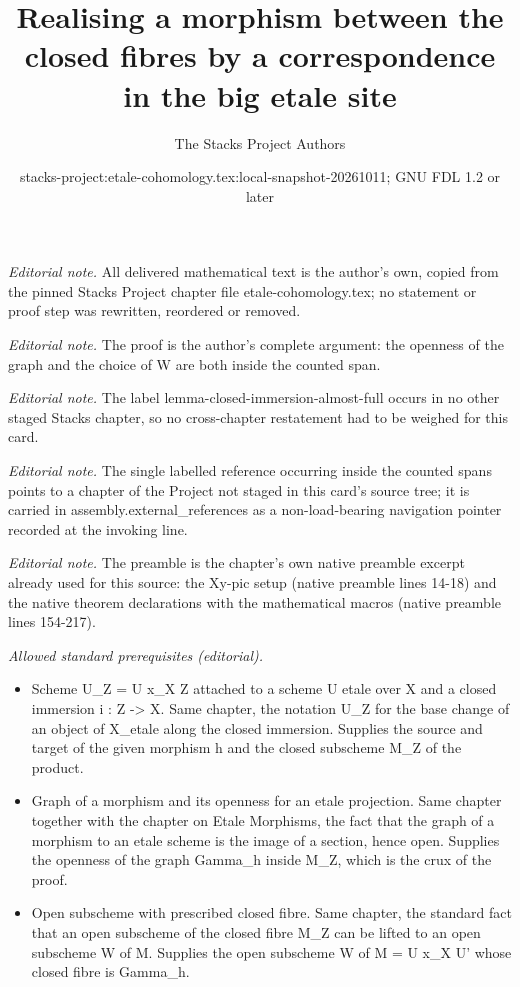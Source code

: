 \documentclass[10pt,a4paper]{amsart}
\title{Realising a morphism between the closed fibres by a correspondence in the big etale site}
\author{The Stacks Project Authors}
\date{stacks-project:etale-cohomology.tex:local-snapshot-20261011; GNU FDL 1.2 or later}
\theoremstyle{plain}
\theoremstyle{definition}
\theoremstyle{remark}
\numberwithin{equation}{subsection}
\begin{document}
\maketitle
\noindent\textit{Editorial note.} All delivered mathematical text is the author's own, copied from the pinned Stacks Project chapter file etale-cohomology.tex; no statement or proof step was rewritten, reordered or removed.\par\medskip
\noindent\textit{Editorial note.} The proof is the author's complete argument: the openness of the graph and the choice of W are both inside the counted span.\par\medskip
\noindent\textit{Editorial note.} The label lemma-closed-immersion-almost-full occurs in no other staged Stacks chapter, so no cross-chapter restatement had to be weighed for this card.\par\medskip
\noindent\textit{Editorial note.} The single labelled reference occurring inside the counted spans points to a chapter of the Project not staged in this card's source tree; it is carried in assembly.external\_references as a non-load-bearing navigation pointer recorded at the invoking line.\par\medskip
\noindent\textit{Editorial note.} The preamble is the chapter's own native preamble excerpt already used for this source: the Xy-pic setup (native preamble lines 14-18) and the native theorem declarations with the mathematical macros (native preamble lines 154-217).\par\medskip
\noindent\textit{Allowed standard prerequisites (editorial).}\begin{itemize}
\item Scheme U\_Z = U x\_X Z attached to a scheme U etale over X and a closed immersion i : Z -> X. Same chapter, the notation U\_Z for the base change of an object of X\_etale along the closed immersion. Supplies the source and target of the given morphism h and the closed subscheme M\_Z of the product.
\item Graph of a morphism and its openness for an etale projection. Same chapter together with the chapter on Etale Morphisms, the fact that the graph of a morphism to an etale scheme is the image of a section, hence open. Supplies the openness of the graph Gamma\_h inside M\_Z, which is the crux of the proof.
\item Open subscheme with prescribed closed fibre. Same chapter, the standard fact that an open subscheme of the closed fibre M\_Z can be lifted to an open subscheme W of M. Supplies the open subscheme W of M = U x\_X U' whose closed fibre is Gamma\_h.
\end{itemize}\medskip
\end{document}
